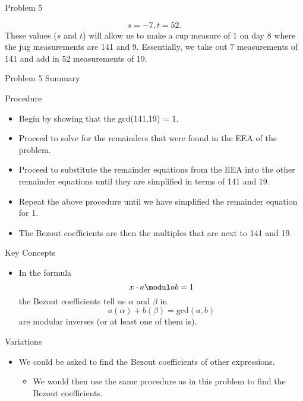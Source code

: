 \begin{problem}{Problem 5}
\begin{Highlight}[Solution]
        \begin{equation}
            s = -7 , t = 52.
        \end{equation}
        These values ($s$ and $t$) will allow us to make a cup measure of 1 on day 8 where the jug measurements are 141 and 9. Essentially, we take out 7 measurements of 141 and add in 52 measurements
        of 19.
    \end{Highlight}
\end{problem}

\begin{summary}{Problem 5 Summary}
    \begin{statement}{Procedure}
        \begin{itemize}
            \item Begin by showing that the gcd(141,19) = 1.
            \item Proceed to solve for the remainders that were found in the EEA of the problem.
            \item Proceed to substitute the remainder equations from the EEA into the other remainder equations until they are simplified in terms of 141 and 19.
            \item Repeat the above procedure until we have simplified the remainder equation for 1.
            \item The Bezout coefficients are then the multiples that are next to 141 and 19.
        \end{itemize}
    \end{statement}
    \begin{statement}{Key Concepts}
        \begin{itemize}
            \item In the formula
            \begin{equation*}
                x \cdot a \modulo b = 1
            \end{equation*}
            the Bezout coefficients tell us $\alpha$ and $\beta$ in 
            \begin{equation*}
                a (\alpha) + b (\beta) = \text{gcd}(a,b)
            \end{equation*}
            are modular inverses (or at least one of them is). 
        \end{itemize}
    \end{statement}
    \begin{statement}{Variations}
        \begin{itemize}
            \item We could be asked to find the Bezout coefficients of other expressions.
            \begin{itemize}
                \item We would then use the same procedure as in this problem to find the Bezout coefficients.
            \end{itemize}
        \end{itemize}
    \end{statement}
\end{summary}

